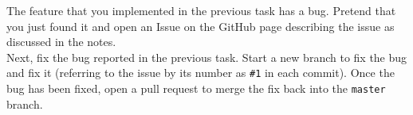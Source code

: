 \documentclass[12pt]{article}
\begin{document}
 The feature that you
implemented in the previous task has a bug. Pretend that you just
found it and open an Issue on the GitHub page describing the issue as
discussed in the notes.\\

 Next, fix
the bug reported in the previous task. Start a new branch to fix the
bug and fix it (referring to the issue by its number as \texttt{\#1} in
each commit). Once the bug has been fixed, open a pull request to
merge the fix back into the \texttt{master} branch.
\end{document}
